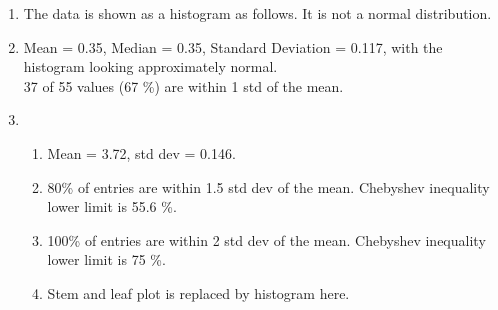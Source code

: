 \begin{enumerate}
	\item The data is shown as a histogram as follows. It is not a normal distribution. \\
	
	\begin{figure}[H]
		\centering
	\end{figure} 
	
	
	\item Mean = 0.35, Median = 0.35, Standard Deviation = 0.117, with the histogram looking approximately normal. \\
	37 of 55 values (67 \%) are within 1 std of the mean. \\
	
	\begin{figure}[H]
		\centering
	\end{figure} 
	
	\item \begin{enumerate}
		\item Mean = 3.72, std dev = 0.146. \\
		
		
		\item 80\% of entries are within 1.5 std dev of the mean. Chebyshev inequality lower limit is 55.6 \%. \\
		\item 100\% of entries are within 2 std dev of the mean. Chebyshev inequality lower limit is 75 \%. \\
		\item Stem and leaf plot is replaced by histogram here.
		

\end{enumerate}
\end{enumerate}
